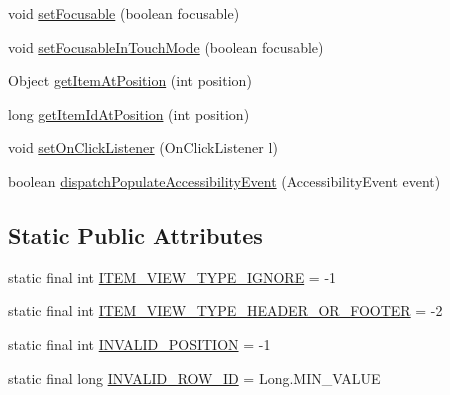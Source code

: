 \begin{DoxyCompactItemize}
\item 
void \hyperlink{classcom_1_1zia_1_1freshdocs_1_1widget_1_1fileexplorer_1_1carousel_1_1_carousel_adapter_3_01_t_01extends_01_adapter_01_4_ac5c5e3116df70af21d68255fe0c56eaf}{set\-Focusable} (boolean focusable)
\item 
void \hyperlink{classcom_1_1zia_1_1freshdocs_1_1widget_1_1fileexplorer_1_1carousel_1_1_carousel_adapter_3_01_t_01extends_01_adapter_01_4_a482aebee1bb60907de1214c84985f429}{set\-Focusable\-In\-Touch\-Mode} (boolean focusable)
\item 
Object \hyperlink{classcom_1_1zia_1_1freshdocs_1_1widget_1_1fileexplorer_1_1carousel_1_1_carousel_adapter_3_01_t_01extends_01_adapter_01_4_a6927fd00d86c773fe30797c4814b216f}{get\-Item\-At\-Position} (int position)
\item 
long \hyperlink{classcom_1_1zia_1_1freshdocs_1_1widget_1_1fileexplorer_1_1carousel_1_1_carousel_adapter_3_01_t_01extends_01_adapter_01_4_a754f13624faeff8cb23bb9676a9ad7c0}{get\-Item\-Id\-At\-Position} (int position)
\item 
void \hyperlink{classcom_1_1zia_1_1freshdocs_1_1widget_1_1fileexplorer_1_1carousel_1_1_carousel_adapter_3_01_t_01extends_01_adapter_01_4_ad2aa202b13c4b28943157c5116cc7374}{set\-On\-Click\-Listener} (On\-Click\-Listener l)
\item 
boolean \hyperlink{classcom_1_1zia_1_1freshdocs_1_1widget_1_1fileexplorer_1_1carousel_1_1_carousel_adapter_3_01_t_01extends_01_adapter_01_4_a95cb1f08dbcb21e48c7923e34ee277b4}{dispatch\-Populate\-Accessibility\-Event} (Accessibility\-Event event)
\end{DoxyCompactItemize}
\subsection*{Static Public Attributes}
\begin{DoxyCompactItemize}
\item 
static final int \hyperlink{classcom_1_1zia_1_1freshdocs_1_1widget_1_1fileexplorer_1_1carousel_1_1_carousel_adapter_3_01_t_01extends_01_adapter_01_4_a89ab93e791d3a881858e410b3b6026d0}{I\-T\-E\-M\-\_\-\-V\-I\-E\-W\-\_\-\-T\-Y\-P\-E\-\_\-\-I\-G\-N\-O\-R\-E} = -\/1
\item 
static final int \hyperlink{classcom_1_1zia_1_1freshdocs_1_1widget_1_1fileexplorer_1_1carousel_1_1_carousel_adapter_3_01_t_01extends_01_adapter_01_4_a86adda1ed4a07132f1523c04f3880e71}{I\-T\-E\-M\-\_\-\-V\-I\-E\-W\-\_\-\-T\-Y\-P\-E\-\_\-\-H\-E\-A\-D\-E\-R\-\_\-\-O\-R\-\_\-\-F\-O\-O\-T\-E\-R} = -\/2
\item 
static final int \hyperlink{classcom_1_1zia_1_1freshdocs_1_1widget_1_1fileexplorer_1_1carousel_1_1_carousel_adapter_3_01_t_01extends_01_adapter_01_4_a06d1af123b5ddb0edbb45869b90df692}{I\-N\-V\-A\-L\-I\-D\-\_\-\-P\-O\-S\-I\-T\-I\-O\-N} = -\/1
\item 
static final long \hyperlink{classcom_1_1zia_1_1freshdocs_1_1widget_1_1fileexplorer_1_1carousel_1_1_carousel_adapter_3_01_t_01extends_01_adapter_01_4_a8bf98a1be4f978abc9f5e0e0b1b6254c}{I\-N\-V\-A\-L\-I\-D\-\_\-\-R\-O\-W\-\_\-\-I\-D} = Long.\-M\-I\-N\-\_\-\-V\-A\-L\-U\-E
\end{DoxyCompactItemize}
